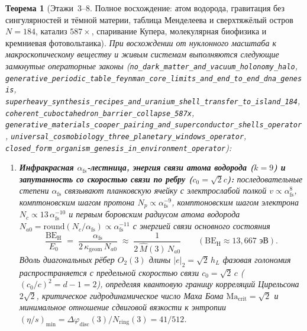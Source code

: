 \documentclass[11pt,a4paper]{article}
\theoremstyle{plain}
\newtheorem{theorem}{Теорема}[section]
\theoremstyle{definition}
\begin{document}
\begin{theorem}[Этажи~3--8. Полное восхождение: атом водорода, гравитация без сингулярностей и тёмной материи, таблица Менделеева и сверхтяжёлый остров $N=184$, катализ $587\times$, спаривание Купера, молекулярная биофизика и кремниевая фотовольтаика]
\label{thm:floors-3-to-8-complete-ascent}
При восхождении от нуклонного масштаба к макроскопическому веществу и живым системам выполняются следующие замкнутые операторные законы (\texttt{no\_dark\_matter\_and\_vacuum\_holonomy\_halo}, \texttt{generative\_periodic\_table\_feynman\_core\_limits\_and\_end\_to\_end\_dna\_genesis}, \texttt{superheavy\_synthesis\_recipes\_and\_uranium\_shell\_transfer\_to\_island\_184}, \texttt{coherent\_cuboctahedron\_barrier\_collapse\_587x}, \texttt{generative\_materials\_cooper\_pairing\_and\_superconductor\_shells\_operator}, \texttt{universal\_cosmobiology\_three\_planetary\_windows\_operator}, \texttt{closed\_form\_organism\_genesis\_in\_environment\_operator}):
\begin{enumerate}[label=\textbf{(\arabic*)},leftmargin=*]
\item \textbf{Инфракрасная $\alpha_{\mathrm{fs}}$-лестница, энергия связи атома водорода ($k = 9$) и запутанность со скоростью связи по ребру ($c_0 = \sqrt{2}c$):}
  последовательные степени $\alpha_{\mathrm{fs}}$ связывают планковскую ячейку с электрослабой полкой $v \propto \alpha_{\mathrm{fs}}^8$, комптоновским шагом протона $N_p \propto \alpha_{\mathrm{fs}}^{-9}$, комптоновским шагом электрона $N_c \propto 13\,\alpha_{\mathrm{fs}}^{-10}$ и первым боровским радиусом атома водорода $N_{a0} = \mathrm{round}(N_c / \alpha_{\mathrm{fs}}) \propto \alpha_{\mathrm{fs}}^{-11}$ с энергией связи основного состояния
  \begin{equation}
    \label{eq:hydrogen-binding-energy}
    \frac{\mathrm{BE}_{\mathrm{H}}}{E_0} \;=\; \frac{\alpha_{\mathrm{fs}}}{2\,\kappa_{\mathrm{geom}}\,N_{a0}} \;\approx\; \frac{1}{2\,\widehat{M}(3)\,N_{a0}} \qquad (\mathrm{BE}_{\mathrm{H}} \approx 13{,}667\text{ эВ}).
  \end{equation}
  Вдоль диагональных рёбер $O_2(3)$ длины $|e|_2 = \sqrt{2}\,h_L$ фазовая голономия распространяется с предельной скоростью связи $c_0 = \sqrt{2}\,c$ ($(c_0/c)^2 = d - 1 = 2$), определяя квантовую границу корреляций Цирельсона $2\sqrt{2}$, критическое гидродинамическое число Маха Бома $\mathrm{Ma}_{\mathrm{crit}} = \sqrt{2}$ и минимальное отношение сдвиговой вязкости к энтропии $(\eta/s)_{\min} = \Delta\varphi_{\mathrm{disc}}(3)/N_{\mathrm{ring}}(3) = 41/512$.


\end{enumerate}
\end{theorem}
\end{document}

